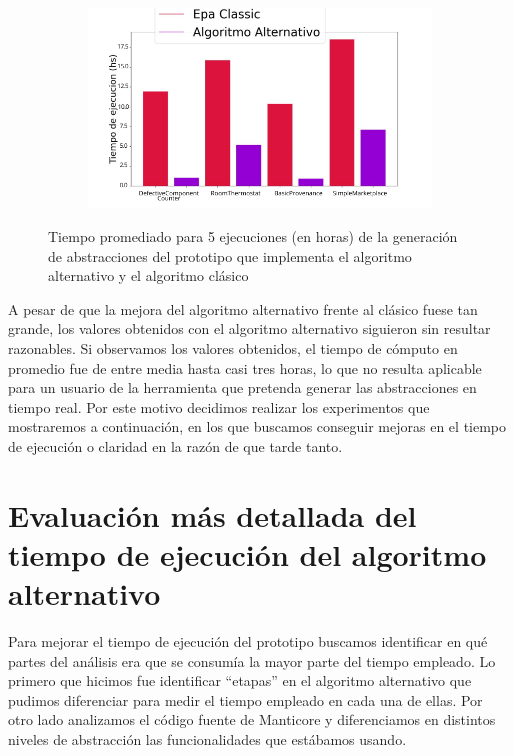 \begin{figure}[h]
    \centering
    \begin{subfigure}{0.65\textwidth}
        \includegraphics[width=\textwidth]{figs/classic_vs_alternativo.png}
        \label{fig:classic-vs-alternativo}
    \end{subfigure}
    \caption{Tiempo promediado para 5 ejecuciones (en horas) de la generación de abstracciones del prototipo que implementa el algoritmo alternativo y el algoritmo clásico}
\end{figure}

A pesar de que la mejora del algoritmo alternativo frente al clásico fuese tan grande, los valores obtenidos con el algoritmo alternativo siguieron sin resultar razonables.
Si observamos los valores obtenidos, el tiempo de cómputo en promedio fue de entre media hasta casi tres horas, lo que no resulta aplicable para un usuario de la herramienta que pretenda generar las abstracciones en tiempo real.
Por este motivo decidimos realizar los experimentos que mostraremos a continuación, en los que buscamos conseguir mejoras en el tiempo de ejecución o claridad en la razón de que tarde tanto.


\section{Evaluación más detallada del tiempo de ejecución del algoritmo alternativo}
Para mejorar el tiempo de ejecución del prototipo buscamos identificar en qué partes del análisis era que se consumía la mayor parte del tiempo empleado.
Lo primero que hicimos fue identificar ``etapas'' en el algoritmo alternativo que pudimos diferenciar para medir el tiempo empleado en cada una de ellas.
Por otro lado analizamos el código fuente de Manticore y diferenciamos en distintos niveles de abstracción las funcionalidades que estábamos usando.

